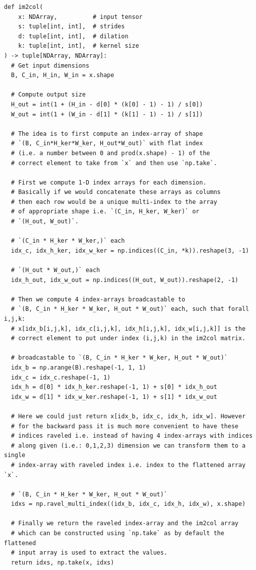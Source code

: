 \documentclass[a5paper]{article}
\begin{document}
\begin{lstlisting}[caption=Im2Col implementation]
def im2col(
    x: NDArray,          # input tensor
    s: tuple[int, int],  # strides
    d: tuple[int, int],  # dilation
    k: tuple[int, int],  # kernel size
) -> tuple[NDArray, NDArray]:
  # Get input dimensions
  B, C_in, H_in, W_in = x.shape

  # Compute output size
  H_out = int(1 + (H_in - d[0] * (k[0] - 1) - 1) / s[0])
  W_out = int(1 + (W_in - d[1] * (k[1] - 1) - 1) / s[1])
  
  # The idea is to first compute an index-array of shape 
  # `(B, C_in*H_ker*W_ker, H_out*W_out)` with flat index 
  # (i.e. a number between 0 and prod(x.shape) - 1) of the 
  # correct element to take from `x` and then use `np.take`.

  # First we compute 1-D index arrays for each dimension.
  # Basically if we would concatenate these arrays as columns
  # then each row would be a unique multi-index to the array
  # of appropriate shape i.e. `(C_in, H_ker, W_ker)` or 
  # `(H_out, W_out)`.

  # `(C_in * H_ker * W_ker,)` each
  idx_c, idx_h_ker, idx_w_ker = np.indices((C_in, *k)).reshape(3, -1)

  # `(H_out * W_out,)` each
  idx_h_out, idx_w_out = np.indices((H_out, W_out)).reshape(2, -1)

  # Then we compute 4 index-arrays broadcastable to 
  # `(B, C_in * H_ker * W_ker, H_out * W_out)` each, such that forall i,j,k: 
  # x[idx_b[i,j,k], idx_c[i,j,k], idx_h[i,j,k], idx_w[i,j,k]] is the 
  # correct element to put under index (i,j,k) in the im2col matrix.

  # broadcastable to `(B, C_in * H_ker * W_ker, H_out * W_out)`
  idx_b = np.arange(B).reshape(-1, 1, 1)
  idx_c = idx_c.reshape(-1, 1)
  idx_h = d[0] * idx_h_ker.reshape(-1, 1) + s[0] * idx_h_out
  idx_w = d[1] * idx_w_ker.reshape(-1, 1) + s[1] * idx_w_out

  # Here we could just return x[idx_b, idx_c, idx_h, idx_w]. However
  # for the backward pass it is much more convenient to have these
  # indices raveled i.e. instead of having 4 index-arrays with indices 
  # along given (i.e.: 0,1,2,3) dimension we can transform them to a single 
  # index-array with raveled index i.e. index to the flattened array `x`.

  # `(B, C_in * H_ker * W_ker, H_out * W_out)`
  idxs = np.ravel_multi_index((idx_b, idx_c, idx_h, idx_w), x.shape)

  # Finally we return the raveled index-array and the im2col array
  # which can be constructed using `np.take` as by default the flattened
  # input array is used to extract the values.
  return idxs, np.take(x, idxs)
\end{lstlisting}
\end{document}
